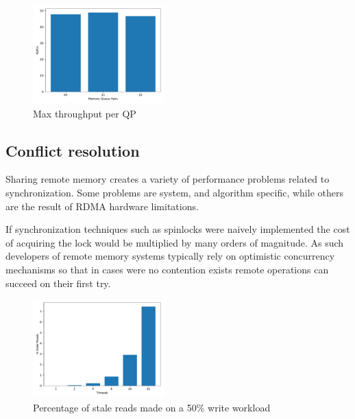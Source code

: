 \begin{figure}[t]
    \includegraphics[width=0.45\textwidth]{fig/qp_bottleneck.pdf}
    \caption{Max throughput per QP }
    \label{fig:qp_bottleneck}
\end{figure}



\subsection{Conflict resolution}

Sharing remote memory creates a variety of performance problems related to
synchronization. Some problems are system, and algorithm specific, while others
are the result of RDMA hardware limitations. 

If synchronization techniques such as spinlocks were naively
implemented the cost of acquiring the lock would be multiplied by many orders of
magnitude. As such developers of remote memory systems typically rely on
optimistic concurrency mechanisms so that in cases were no contention exists
remote operations can succeed on their first try.

\begin{figure}[t]
    \includegraphics[width=0.45\textwidth]{fig/stale_reads.pdf}
    \caption{Percentage of stale reads made on a 50\% write workload}
    \label{fig:stale_reads}
\end{figure}

